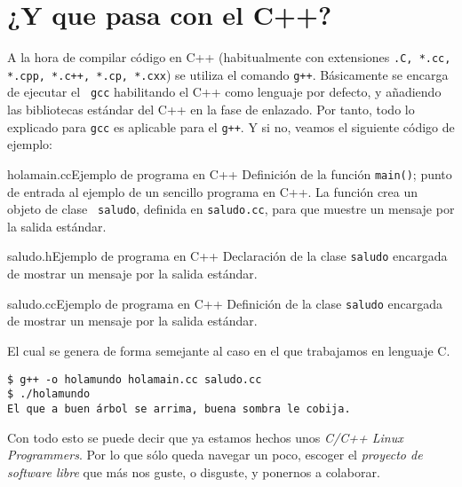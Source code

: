 \section{¿Y que pasa con el C++?}

A la hora de compilar código en C++ (habitualmente con extensiones
{\tt *.C, *.cc, *.cpp, *.c++, *.cp, *.cxx}) se utiliza el comando
{\tt g++}. Básicamente se encarga de ejecutar el {\tt
gcc} habilitando el C++ como lenguaje por defecto, y añadiendo las
bibliotecas estándar del C++ en la fase de enlazado. Por tanto, todo lo
explicado para {\tt gcc} es aplicable para el {\tt g++}. Y si no, veamos
el siguiente código de ejemplo:

\begin{ejemplo}{holamain.cc}{Ejemplo de programa en C++}
Definición de la función {\tt main()}; punto de entrada al ejemplo de un
sencillo programa en C++. La función crea un objeto de clase {\tt
saludo}, definida en {\tt saludo.cc}, para que muestre un mensaje por la
salida estándar.
\end{ejemplo}

\begin{ejemplo}{saludo.h}{Ejemplo de programa en C++}
Declaración de la clase {\tt saludo} encargada de mostrar un mensaje por
la salida estándar.
\end{ejemplo}

\begin{ejemplo}{saludo.cc}{Ejemplo de programa en C++}
Definición de la clase {\tt saludo} encargada de mostrar un mensaje por
la salida estándar.
\end{ejemplo}

El cual se genera de forma semejante al caso en el que trabajamos en
lenguaje C.

\begin{verbatim}
$ g++ -o holamundo holamain.cc saludo.cc
$ ./holamundo
El que a buen árbol se arrima, buena sombra le cobija.
\end{verbatim}

Con todo esto se puede decir que ya estamos hechos unos {\em C/C++ Linux
Programmers}. Por lo que sólo queda navegar un poco, escoger el {\em
proyecto de software libre} que más nos guste, o disguste, y ponernos a
colaborar.
